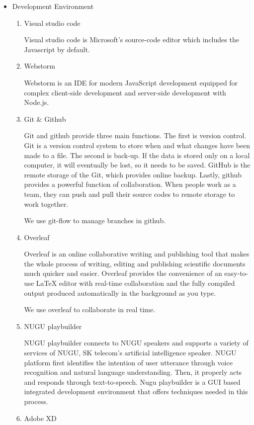 \documentclass[conference]{IEEEtran}
\begin{document}
\begin{itemize}

    \item Development Environment 
    \begin{enumerate}
    \setlength{\parindent}{2ex}
        \item Visual studio code
        
        Visual studio code is Microsoft's source-code editor which includes the Javascript by default.
        \item Webstorm
        
        Webstorm is an IDE for modern JavaScript development equipped for complex client-side development and server-side development with Node.js.
        \item Git \& Github
        
        Git and github provide three main functions. The first is version control. Git is a version control system to store when and what changes have been made to a file. The second is back-up. If the data is stored only on a local computer, it will eventually be lost, so it needs to be saved. GitHub is the remote storage of the Git, which provides online backup. Lastly, github provides a powerful function of collaboration. When people work as a team, they can push and pull their source codes to remote storage to work together. 
        
        We use git-flow to manage branches in github. 
        \item Overleaf
        
        Overleaf is an online collaborative writing and publishing tool that makes the whole process of writing, editing and publishing scientific documents much quicker and easier. Overleaf provides the convenience of an easy-to-use LaTeX editor with real-time collaboration and the fully compiled output produced automatically in the background as you type. 
        
        We use overleaf to collaborate in real time.\cite{b6} 
        \item NUGU playbuilder
        
        NUGU playbuilder connects to NUGU speakers and supports a variety of services of NUGU, SK telecom’s artificial intelligence speaker. NUGU platform first identifies the intention of user utterance through voice recognition and natural language understanding. Then, it properly acts and responds through text-to-speech. Nugu playbuilder is a GUI based integrated development environment that offers techniques needed in this process.  
        \item Adobe XD
        

\end{enumerate}
\end{itemize}
\end{document}
